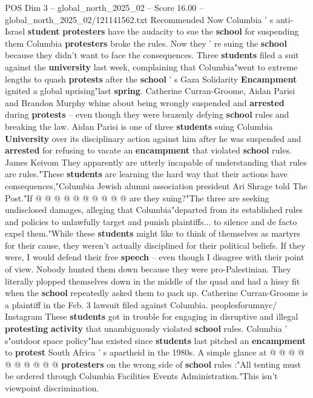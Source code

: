 \begin{textsample}{POS Dim 3 – global\_north\_2025\_02 – Score 16.00 – global\_north\_2025\_02/121141562.txt}  \label{ex:f3_pos_285}
Recommended Now Columbia ' s anti-Israel \textbf{student} \textbf{protesters} have the audacity to sue the \textbf{school} for suspending them Columbia \textbf{protesters} broke the rules.
Now they ' re suing the \textbf{school} because they didn't want to face the consequences.
Three \textbf{students} filed a suit against the \textbf{university} last week, complaining that Columbia"went to extreme lengths to quash \textbf{protests} after the \textbf{school} ' s Gaza Solidarity \textbf{Encampment} ignited a global uprising"last \textbf{spring}.
Catherine Curran-Groome, Aidan Parisi and Brandon Murphy whine about being wrongly suspended and \textbf{arrested} during \textbf{protests} -- even though they were brazenly defying \textbf{school} rules and breaking the law.
Aidan Parisi is one of three \textbf{students} suing Columbia \textbf{University} over its disciplinary action against him after he was suspended and \textbf{arrested} for refusing to vacate an \textbf{encampment} that violated \textbf{school} rules.
James Keivom They apparently are utterly incapable of understanding that rules are rules."These \textbf{students} are learning the hard way that their actions have consequences,"Columbia Jewish alumni association president Ari Shrage told The Post."If @ @ @ @ @ @ @ @ @ @ are they suing?"The three are seeking undisclosed damages, alleging that Columbia"departed from its established rules and policies to unlawfully target and punish plaintiffs... to silence and de facto expel them."While these \textbf{students} might like to think of themselves as martyrs for their cause, they weren't actually disciplined for their political beliefs.
If they were, I would defend their free \textbf{speech} -- even though I disagree with their point of view.
Nobody hunted them down because they were pro-Palestinian.
They literally plopped themselves down in the middle of the quad and had a hissy fit when the \textbf{school} repeatedly asked them to pack up.
Catherine Curran-Groome is a plaintiff in the Feb. 3 lawsuit filed against Columbia. peoplesforumnyc/ Instagram These \textbf{students} got in trouble for engaging in disruptive and illegal \textbf{protesting} \textbf{activity} that unambiguously violated \textbf{school} rules.
Columbia ' s"outdoor space policy"has existed since \textbf{students} last pitched an \textbf{encampment} to \textbf{protest} South Africa ' s apartheid in the 1980s.
A simple glance at @ @ @ @ @ @ @ @ @ @ \textbf{protesters} on the wrong side of \textbf{school} rules :"All tenting must be ordered through Columbia Facilities Events Administration."This isn't viewpoint discrimination.

\end{textsample}
